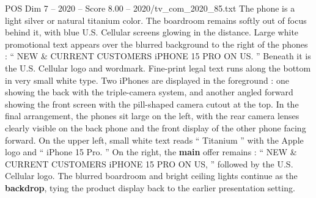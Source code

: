 \begin{textsample}{POS Dim 7 – 2020 – Score 8.00 – 2020/tv\_com\_2020\_85.txt}
The phone is a light silver or natural titanium color.
The boardroom remains softly out of focus behind it, with blue U.S.
Cellular screens glowing in the distance.
Large white promotional text appears over the blurred background to the right of the phones : “ NEW \& CURRENT CUSTOMERS iPHONE 15 PRO ON US. ” Beneath it is the U.S.
Cellular logo and wordmark.
Fine-print legal text runs along the bottom in very small white type.
Two iPhones are displayed in the foreground : one showing the back with the triple-camera system, and another angled forward showing the front screen with the pill-shaped camera cutout at the top.
In the final arrangement, the phones sit large on the left, with the rear camera lenses clearly visible on the back phone and the front display of the other phone facing forward.
On the upper left, small white text reads “ Titanium ” with the Apple logo and “ iPhone 15 Pro. ” On the right, the \textbf{main} offer remains : “ NEW \& CURRENT CUSTOMERS iPHONE 15 PRO ON US, ” followed by the U.S.
Cellular logo.
The blurred boardroom and bright ceiling lights continue as the \textbf{backdrop}, tying the product display back to the earlier presentation setting.

\end{textsample}
